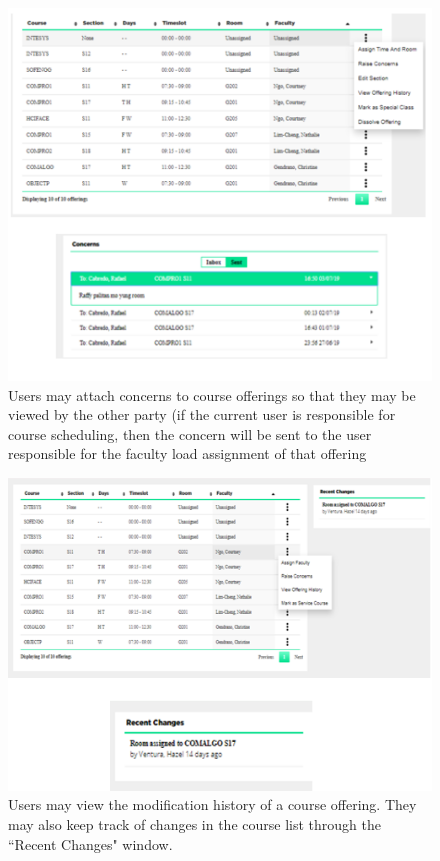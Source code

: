 \begin{figure}[h]
   \centering
  \includegraphics[scale=0.7]{PCSC2019_latex/Screenshots/concerns_itr3.PNG}
   \caption{Users may attach concerns to course offerings so that they may be viewed by the other party (if the current user is responsible for course scheduling, then the concern will be sent to the user responsible for the faculty load assignment of that offering} \label{fig:workspaceHistory}
\end{figure}
\begin{figure}[h]
   \centering
  \includegraphics[scale=0.7]{PCSC2019_latex/Screenshots/workspacehistory.PNG}
   \caption{Users may view the modification history of a course offering. They may also keep track of changes in the course list through the ``Recent Changes" window.} \label{fig:workspaceHistory}
\end{figure}

